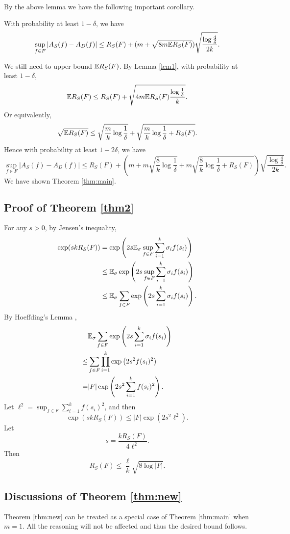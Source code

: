 By the above lemma we have the following important corollary.
\begin{corollary}
With probability at least $1-\delta$, we have
$$\sup_{f\in F}|A_S(f) - A_D(f)| \leq R_S(F) + (m+\sqrt{8m \mathbb{E} R_S(F)})\sqrt{\frac{\log \frac{4}{\delta}}{2k}}.$$
\end{corollary}

We still need to upper bound $\mathbb{E} R_S(F)$. By Lemma \ref{lem1}, with probability at least $1-\delta$,
$$\mathbb{E} R_S(F) \leq R_S(F) + \sqrt{4m\mathbb{E} R_S(F)\frac{\log \frac{1}{\delta}}{k}}.$$
Or equivalently,
$$\sqrt{\mathbb{E} R_S(F)} \leq \sqrt{\frac{m}{k}\log \frac{1}{\delta}} + \sqrt{\frac{m}{k}\log \frac{1}{\delta} + R_S(F)}.$$
Hence with probability at least $1-2\delta$, we have
$$\sup_{f\in F}|A_S(f) - A_D(f)| \leq R_S(F) + \left(m+m\sqrt{\frac{8}{k}\log \frac{1}{\delta}} + m\sqrt{\frac{8}{k}\log \frac{1}{\delta} + R_S(F)}\right)\sqrt{\frac{\log \frac{4}{\delta}}{2k}}.$$
We have shown Theorem \ref{thm:main}.


\subsection{Proof of Theorem \ref{thm2}}
For any $s>0$, by Jensen's inequality,
$$\begin{aligned}
\exp(skR_S(F)) & = \exp\left(2s\mathbb{E}_\sigma \sup_{f\in F} \sum_{i=1}^k \sigma_i f(s_i)\right) \\
&\leq \mathbb{E}_\sigma \exp\left(2s \sup_{f\in F} \sum_{i=1}^k \sigma_i f(s_i)\right) \\
&\leq \mathbb{E}_\sigma \sum_{f\in F} \exp\left(2s\sum_{i=1}^k \sigma_i f(s_i)\right).
\end{aligned}$$
By Hoeffding's Lemma \cite{H63},
$$\begin{aligned}
&\mathbb{E}_\sigma \sum_{f\in F} \exp\left(2s\sum_{i=1}^k \sigma_i f(s_i)\right) \\
\leq & \sum_{f\in F}\prod_{i=1}^k \exp\left(2s^2f(s_i)^2\right) \\
=& |F| \exp\left(2s^2\sum_{i=1}^k f(s_i)^2\right).
\end{aligned}$$
Let $\ell^2 = \sup_{f\in F}\sum_{i=1}^k f(s_i)^2$, and then
$$\exp(skR_S(F)) \leq |F| \exp\left(2s^2\ell^2\right).$$
Let
$$s = \frac{kR_S(F)}{4\ell^2}.$$
Then 
$$R_S(F) \leq \frac{\ell}{k}\sqrt{8\log |F|}.$$ 


\subsection{Discussions of Theorem \ref{thm:new}}
Theorem \ref{thm:new} can be treated as a special case of Theorem \ref{thm:main} when $m=1$. All the reasoning will not be affected and thus the desired bound follows.